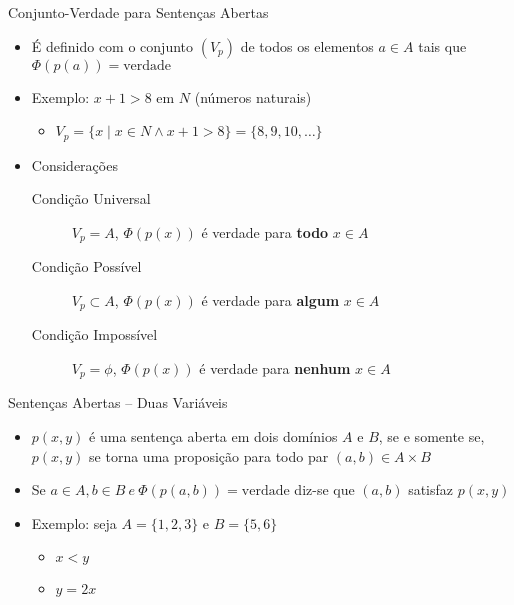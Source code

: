 \begin{frame}[t]{Conjunto-Verdade para Sentenças Abertas}
	\begin{itemize} \itemsep 0.7cm
	\item É definido com o conjunto $(V_p)$ de todos os elementos $a \in A$ tais que $\Phi(p(a)) = \mbox{verdade}$

	\item Exemplo: $x + 1 > 8$ em $N$ (números naturais)
	\begin{itemize}
	\item $V_p = \{ x \mid x \in N \wedge x + 1 > 8\} = \{8, 9, 10, \ldots\}$
	\end{itemize}

	\item Considerações
	\begin{description}
	\item [Condição Universal] $V_p = A$, $\Phi(p(x))$ é verdade para {\bf todo} $x \in A$
	\item [Condição Possível]  $V_p \subset A$, $\Phi(p(x))$ é verdade para {\bf algum} $x \in A$
	\item [Condição Impossível] $V_p = \phi$, $\Phi(p(x))$ é verdade para {\bf nenhum} $x \in A$
	\end{description}
	\end{itemize}
\end{frame}

\begin{frame}[t]{Sentenças Abertas -- Duas Variáveis}
	\begin{itemize} \itemsep 0.4cm
	\item $p(x,y)$ é uma sentença aberta em dois domínios $A$ e $B$, se e somente se, $p(x,y)$ se torna uma proposição para todo par $(a,b) \in A \times B$

	\item Se $a \in A, b \in B ~e~ \Phi(p(a,b)) = \mbox{verdade}$ diz-se que $(a,b)$ satisfaz $p(x,y)$

	\item Exemplo: seja $A = \{1, 2, 3\}$ e $B = \{5, 6\}$
	\begin{itemize}
	\item $x < y$
	\item $y = 2x$
	\end{itemize}
	\end{itemize}
\end{frame}

